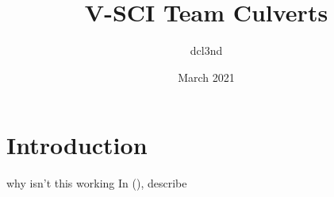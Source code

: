 \documentclass[11pt,a4paper]{article}
\title{V-SCI Team Culverts}
\author{dcl3nd }
\date{March 2021}
\begin{document}
\maketitle

\section*{Introduction}

\cite{politi2021laup} why isn't this working
In (\cite{monroe2021le}), describe 

\printbibliography
\end{document}
